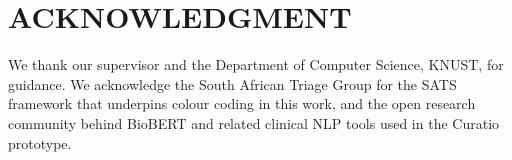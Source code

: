 \chapter*{ACKNOWLEDGMENT}

We thank our supervisor and the Department of Computer Science, KNUST, for guidance. We acknowledge the South African Triage Group for the SATS framework that underpins colour coding in this work, and the open research community behind BioBERT and related clinical NLP tools used in the Curatio prototype.
